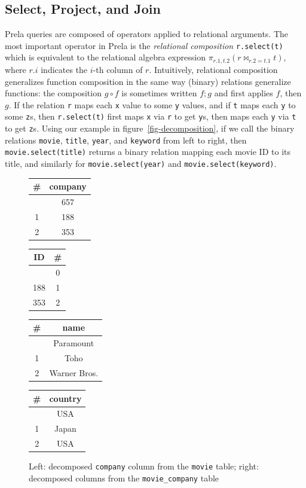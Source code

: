 \documentclass[sigconf,screen,pbalance]{cidr-2027}
\newcommand{\code}{\lstinline[style=prela]}
\newenvironment{reltable}[1]
  {\begingroup\setlength{\arrayrulewidth}{0.5pt}\setlength{\tabcolsep}{4pt}%
   \renewcommand{\arraystretch}{0.95}\begin{tabular}{#1}\hline}
  {\\\hline\end{tabular}\endgroup}
\newcommand{\headergap}{\\\hline\noalign{\vskip 2pt}\hline}
\begin{document}
\subsection{Select, Project, and Join}

Prela queries are composed of operators applied to relational arguments.
The most important operator in Prela is the \emph{relational composition} \code|r.select(t)| which is equivalent to the relational algebra expression $\pi_{r.1, t.2}(r \bowtie_{r.2 = t.1} t)$, where $r.i$ indicates the $i$-th column of $r$.
Intuitively, relational composition generalizes function composition in the same way (binary) relations generalize functions: the composition $g \circ f$ is sometimes written $f; g$ and first applies $f$, then $g$.
If the relation \code|r| maps each \code|x| value to some \code|y| values, and if \code|t| maps each \code|y| to some \code|z|s, then \code|r.select(t)| first maps \code|x| via \code|r| to get \code|y|s, then maps each \code|y| via \code|t| to get \code|z|s.
Using our example in figure~\ref{fig-decomposition}, if we call the binary relations \code|movie|, \code|title|, \code|year|, and \code|keyword| from left to right, then \code|movie.select(title)| returns a binary relation mapping each movie ID to its title, and similarly for \code|movie.select(year)| and \code|movie.select(keyword)|.

\begin{figure}
\begin{reltable}{|c|c|}
\# & company \headergap
0 & 657 \\\hline 1 & 188 \\\hline 2 & 353
\end{reltable}\hfill
\begin{reltable}{|c|c|}
ID & \# \headergap
657 & 0 \\\hline 188 & 1 \\\hline 353 & 2
\end{reltable}\hspace{2.5pt}%
\begin{reltable}{|c|c|}
\# & name \headergap
0 & Paramount \\\hline 1 & Toho \\\hline 2 & Warner Bros.
\end{reltable}\hspace{2.5pt}%
\begin{reltable}{|c|c|}
\# & country \headergap
0 & USA \\\hline 1 & Japan \\\hline 2 & USA
\end{reltable}
\caption{Left: decomposed \texttt{company} column from the \texttt{movie} table; right: decomposed columns from the \texttt{movie\_company} table}
\label{fig-left-decomposed}
\end{figure}
\end{document}
